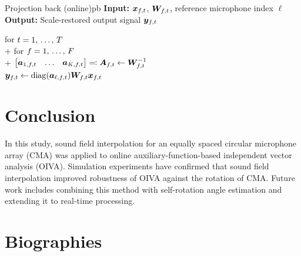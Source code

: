 \documentclass[sip,biber]{now-journal}
\begin{document}
\begin{algorithm}{Projection back (online)}{pb}
  \textbf{Input:} $\Obs _{\ft}$, $\Demix _{\ft}$, reference microphone index $\ell$\\
  \textbf{Output:} Scale-restored output signal $\Est _{\ft}$
  \begin{pseudo}
    for $t = 1,\, \dots,\, T$ \\+
      for $f = 1,\, \dots,\, F$ \\+
        $\begin{bmatrix} \steer _{1,\ft} & \dots & \steer _{\Mic,\ft} \end{bmatrix} \eqqcolon \Steer _{\ft} \gets \Demix _{\ft} ^{-1}$ \\
        $\Est _{\ft} \gets \mathrm{diag}(\steer _{\ell,\ft}) \Demix _{\ft} \Obs _{\ft}$
  \end{pseudo}
\end{algorithm}

\section{Conclusion}\label{sec:conclusion}
In this study, sound field interpolation for an equally spaced circular microphone array (CMA) was applied to online auxiliary-function-based independent vector analysis (OIVA).
Simulation experiments have confirmed that sound field interpolation improved robustness of OIVA against the rotation of CMA.
Future work includes combining this method with self-rotation angle estimation \cite{Lian:2021:APSIPA} and extending it to real-time processing.

\section*{Biographies}
\end{document}

